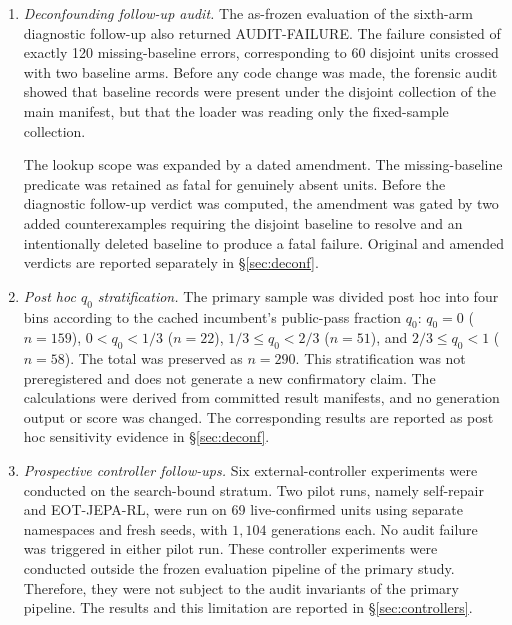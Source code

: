 \documentclass{article}
\numberwithin{equation}{section}  %
\theoremstyle{definition}
\begin{document}
\begin{enumerate}[label=(\roman*),leftmargin=2em]
With the dated amendment, output-pair equality under intentionally identical prompts was
reclassified from a fatal predicate to a counted diagnostic. Seed-payload collision, namespace
reuse, and provenance inconsistency were retained as fatal predicates. The amendment was gated
by a five-counterexample falsification suite, including a counterexample requiring a doctored
seed-copy to remain fatal. The official amended evaluation was recomputed only after the suite
passed 5/5. Both the as-frozen AUDIT-FAILURE verdict and the post-amendment CERTIFIED verdicts
are preserved in the main results documents and in this appendix.

\item \emph{Deconfounding follow-up audit.}
The as-frozen evaluation of the sixth-arm diagnostic follow-up also returned AUDIT-FAILURE.
The failure consisted of exactly 120 missing-baseline errors, corresponding to 60 disjoint
units crossed with two baseline arms. Before any code change was made, the forensic audit
showed that baseline records were present under the disjoint collection of the main manifest,
but that the loader was reading only the fixed-sample collection.

The lookup scope was expanded by a dated amendment. The missing-baseline predicate was
retained as fatal for genuinely absent units. Before the diagnostic follow-up verdict was
computed, the amendment was gated by two added counterexamples requiring the disjoint baseline
to resolve and an intentionally deleted baseline to produce a fatal failure. Original and
amended verdicts are reported separately in \S\ref{sec:deconf}.

\item \emph{Post hoc $q_0$ stratification.}
The primary sample was divided post hoc into four bins according to the cached incumbent's
public-pass fraction $q_0$: $q_0{=}0$ ($n{=}159$), $0{<}q_0{<}1/3$ ($n{=}22$),
$1/3{\le}q_0{<}2/3$ ($n{=}51$), and $2/3{\le}q_0{<}1$ ($n{=}58$). The total was preserved as
$n=290$. This stratification was not preregistered and does not generate a new confirmatory
claim. The calculations were derived from committed result manifests, and no generation output
or score was changed. The corresponding results are reported as post hoc sensitivity evidence
in \S\ref{sec:deconf}.

\item \emph{Prospective controller follow-ups.}
Six external-controller experiments were conducted on the search-bound stratum. Two pilot
runs, namely self-repair and EOT-JEPA-RL, were run on 69 live-confirmed units using separate
namespaces and fresh seeds, with $1{,}104$ generations each. No audit failure was triggered in
either pilot run. These controller experiments were conducted outside the frozen evaluation
pipeline of the primary study. Therefore, they were not subject to the audit invariants of the
primary pipeline. The results and this limitation are reported in \S\ref{sec:controllers}.

\end{enumerate}
\end{document}
